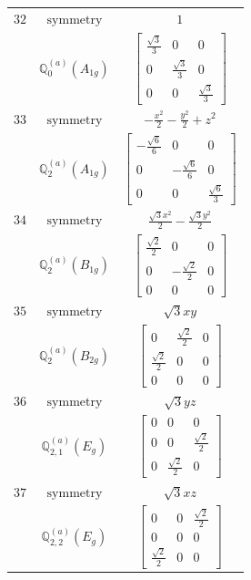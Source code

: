 \documentclass[fleqn,8pt,landscape]{jsarticle}
\begin{document}
\begin{longtable}{ccc}
$ 32 $ & $ \text{symmetry} $ & $ 1 $ \\
$  $ & $ \mathbb{Q}_{0}^{(a)}(A_{1g}) $ & $ \begin{bmatrix} \frac{\sqrt{3}}{3} & 0 & 0 \\ 0 & \frac{\sqrt{3}}{3} & 0 \\ 0 & 0 & \frac{\sqrt{3}}{3} \end{bmatrix} $ \\ \hline
$ 33 $ & $ \text{symmetry} $ & $ - \frac{x^{2}}{2} - \frac{y^{2}}{2} + z^{2} $ \\
$  $ & $ \mathbb{Q}_{2}^{(a)}(A_{1g}) $ & $ \begin{bmatrix} - \frac{\sqrt{6}}{6} & 0 & 0 \\ 0 & - \frac{\sqrt{6}}{6} & 0 \\ 0 & 0 & \frac{\sqrt{6}}{3} \end{bmatrix} $ \\ \hline
$ 34 $ & $ \text{symmetry} $ & $ \frac{\sqrt{3} x^{2}}{2} - \frac{\sqrt{3} y^{2}}{2} $ \\
$  $ & $ \mathbb{Q}_{2}^{(a)}(B_{1g}) $ & $ \begin{bmatrix} \frac{\sqrt{2}}{2} & 0 & 0 \\ 0 & - \frac{\sqrt{2}}{2} & 0 \\ 0 & 0 & 0 \end{bmatrix} $ \\ \hline
$ 35 $ & $ \text{symmetry} $ & $ \sqrt{3} x y $ \\
$  $ & $ \mathbb{Q}_{2}^{(a)}(B_{2g}) $ & $ \begin{bmatrix} 0 & \frac{\sqrt{2}}{2} & 0 \\ \frac{\sqrt{2}}{2} & 0 & 0 \\ 0 & 0 & 0 \end{bmatrix} $ \\ \hline
$ 36 $ & $ \text{symmetry} $ & $ \sqrt{3} y z $ \\
$  $ & $ \mathbb{Q}_{2,1}^{(a)}(E_{g}) $ & $ \begin{bmatrix} 0 & 0 & 0 \\ 0 & 0 & \frac{\sqrt{2}}{2} \\ 0 & \frac{\sqrt{2}}{2} & 0 \end{bmatrix} $ \\ \hline
$ 37 $ & $ \text{symmetry} $ & $ \sqrt{3} x z $ \\
$  $ & $ \mathbb{Q}_{2,2}^{(a)}(E_{g}) $ & $ \begin{bmatrix} 0 & 0 & \frac{\sqrt{2}}{2} \\ 0 & 0 & 0 \\ \frac{\sqrt{2}}{2} & 0 & 0 \end{bmatrix} $ \\ \hline

\end{longtable}
\end{document}
